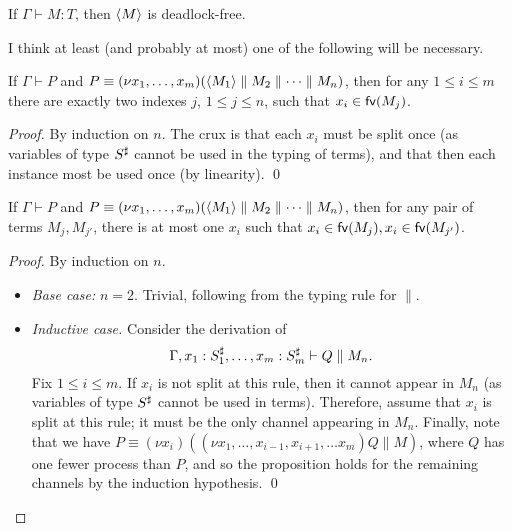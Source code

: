 \documentclass[orivec,envcountsame]{llncs}
\begin{document}
\begin{theorem}\label{thm:typed-terms-df}
  If $\Gamma \vdash M: T$, then $\langle M \rangle$ is deadlock-free.
\end{theorem}

I think at least (and probably at most) one of the following will be necessary.

\begin{lemma}\label{thm:channel-used-twice}
  If $\Gamma \vdash P$ and $P \equiv (\nu x_1,\dots,x_m)(\langle M_1 \rangle \parallel M_2 \parallel
  \dots \parallel M_n)$, then for any $1 \leq i \leq m$ there are exactly two indexes $j$, $1 \leq j
  \leq n$, such that $x_i \in \mathsf{fv}(M_j)$.
\end{lemma}

\begin{proof}
  By induction on $n$.  The crux is that each $x_i$ must be split once (as variables of type
  $S^\sharp$ cannot be used in the typing of terms), and that then each instance most be used
  once (by linearity). \qed
\end{proof}

\begin{lemma}\label{thm:procs-share-one-channel}
  If $\Gamma \vdash P$ and $P \equiv (\nu x_1,\dots,x_m)(\langle M_1 \rangle \parallel M_2 \parallel
  \dots \parallel M_n)$, then for any pair of terms $M_j,M_{j'}$, there is at most one $x_i$ such
  that $x_i \in \mathsf{fv}(M_j),x_i \in \mathsf{fv}(M_{j'})$.
\end{lemma}

\begin{proof}
  By induction on $n$.
  \begin{itemize}
  \item \textit{Base case:} $n = 2$.  Trivial, following from the typing rule for $\parallel$.
  \item \textit{Inductive case.} Consider the derivation of
    \[ \Gamma,x_1:S_1^\sharp,\dots,x_m:S_m^\sharp \vdash Q \parallel M_n. \] Fix $1 \leq i
    \leq m$.  If $x_i$ is not split at this rule, then it cannot appear in $M_n$ (as variables of
    type $S^\sharp$ cannot be used in terms).  Therefore, assume that $x_i$ is split at this
    rule; it must be the only channel appearing in $M_n$.  Finally, note that we have $P \equiv (\nu
    x_i)((\nu x_1,\dots,x_{i-1},x_{i+1},\dots x_m)Q \parallel M)$, where $Q$ has one fewer process
    than $P$, and so the proposition holds for the remaining channels by the induction
    hypothesis. \qed
  \end{itemize}
\end{proof}
\end{document}
